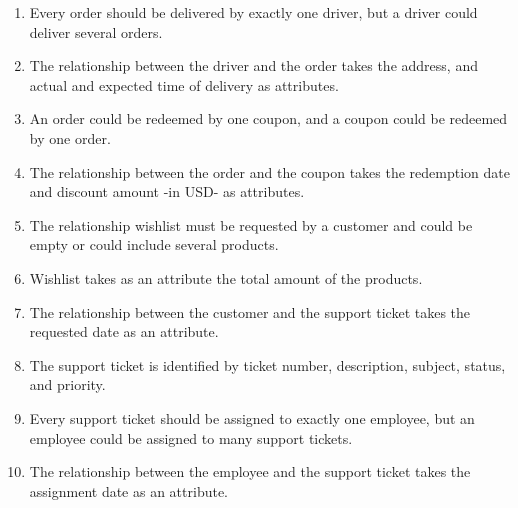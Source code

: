 \begin{enumerate}
  \item Every order should be delivered by exactly one driver, but a driver could deliver several orders.
  \item The relationship between the driver and the order takes the address, and actual and expected time of delivery as attributes.
  \item An order could be redeemed by one coupon, and a coupon could be redeemed by one order.
  \item The relationship between the order and the coupon takes the redemption date and discount amount -in USD- as attributes.
  \item The relationship wishlist must be requested by a customer and could be empty or could include several products.
  \item Wishlist takes as an attribute the total amount of the products.
  \item The relationship between the customer and the support ticket takes the requested date as an attribute.
  \item The support ticket is identified by ticket number, description, subject, status, and priority.
  \item Every support ticket should be assigned to exactly one employee, but an employee could be assigned to many support tickets.
  \item The relationship between the employee and the support ticket takes the assignment date as an attribute.
\end{enumerate}
